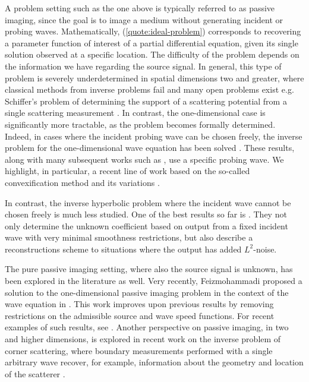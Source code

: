 \documentclass[10pt,a4paper]{article}
\theoremstyle{plain}
\theoremstyle{definition}
\theoremstyle{remark}
\numberwithin{equation}{section}
\begin{document}
A problem setting such as the one above is typically referred to as passive imaging, since the goal is to image a medium without generating incident or probing waves. Mathematically, (\ref{quote:ideal-problem}) corresponds to recovering a parameter function of interest of a partial differential equation, given its single solution observed at a specific location. The difficulty of the problem depends on the information we have regarding the source signal. In general, this type of problem is severely underdetermined in spatial dimensions two and greater, where classical methods from inverse problems fail and many open problems exist e.g. Schiffer's problem of determining the support of a scattering potential from a single scattering measurement \cite{lax89_scatt_theor}. In contrast, the one-dimensional case is significantly more tractable, as the problem becomes formally determined. Indeed, in cases where the incident probing wave can be chosen freely, the inverse problem for the one-dimensional wave equation has been solved \cite{gelfand55_deter_differ_equat_from_its_spect_funct,sondhi_gopinath}. These results, along {with} many subsequent works such as \cite{bukhgeim1981global, cheng2002identification, cheng2009uniqueness, feizmohammadi2023global, helin2012inverse, helin2014inverse, Rakesh_2001, stefanov2013recovery, helin2020inverse}, use a specific probing wave. 
We highlight, in particular, a recent line of work based {on} the so-called convexification method and its variations \cite{smirnov20_convex_1d_hyper_coeff_inver,smirnov20_convex_inver_probl_1d_wave,le22_carlem_contr_mappin_1d_inver}.

{In contrast, the inverse hyperbolic problem where the incident wave cannot be chosen freely is much less studied. One of the best results so far is \cite{romanov20_recon_princ_coeff_damped_wave}. They not only determine the unknown coefficient based on output from a fixed incident wave with very minimal smoothness restrictions, but also describe a reconstructions scheme to situations where the output has added $L^2$-noise.}

The pure passive imaging setting, where also the source signal is unknown, has been explored in the literature as well. Very recently, Feizmohammadi proposed a solution to the one-dimensional passive imaging problem in the context of the wave equation in \cite{ali_passive}. This work improves upon previous results by removing restrictions on the admissible source and wave speed functions. For recent examples of such results, see \cite{knox2020determining, liu2015determining, kian2023determination, avdonin2014reconstructing, finch2013transmission, jing2021simultaneous}. Another perspective on passive imaging, in two and higher dimensions, is explored in recent work on the inverse problem of corner scattering, where boundary measurements performed with a single arbitrary wave recover, for example, information about the geometry and location of the scatterer \cite{blåsten14_corner_alway_scatt, hu16_shape_ident_inver_medium_scatt, blåsten20_unique_deter_shape_scatt_screen}.
\end{document}
